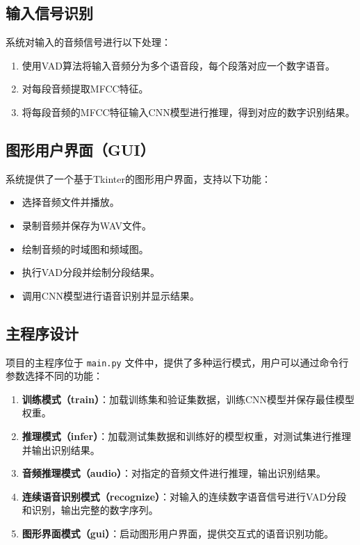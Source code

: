 \documentclass[12pt,hyperref,a4paper,UTF8]{ctexart}
\begin{document}
\subsection*{输入信号识别}

系统对输入的音频信号进行以下处理：
\begin{enumerate}
    \item 使用VAD算法将输入音频分为多个语音段，每个段落对应一个数字语音。
    \item 对每段音频提取MFCC特征。
    \item 将每段音频的MFCC特征输入CNN模型进行推理，得到对应的数字识别结果。
\end{enumerate}

\subsection*{图形用户界面（GUI）}

系统提供了一个基于Tkinter的图形用户界面，支持以下功能：
\begin{itemize}
    \item 选择音频文件并播放。
    \item 录制音频并保存为WAV文件。
    \item 绘制音频的时域图和频域图。
    \item 执行VAD分段并绘制分段结果。
    \item 调用CNN模型进行语音识别并显示结果。
\end{itemize}

\subsection{主程序设计}

项目的主程序位于 \texttt{main.py} 文件中，提供了多种运行模式，用户可以通过命令行参数选择不同的功能：
\begin{enumerate}
    \item \textbf{训练模式（train）}：加载训练集和验证集数据，训练CNN模型并保存最佳模型权重。
    \item \textbf{推理模式（infer）}：加载测试集数据和训练好的模型权重，对测试集进行推理并输出识别结果。
    \item \textbf{音频推理模式（audio）}：对指定的音频文件进行推理，输出识别结果。
    \item \textbf{连续语音识别模式（recognize）}：对输入的连续数字语音信号进行VAD分段和识别，输出完整的数字序列。
    \item \textbf{图形界面模式（gui）}：启动图形用户界面，提供交互式的语音识别功能。
\end{enumerate}
\end{document}

